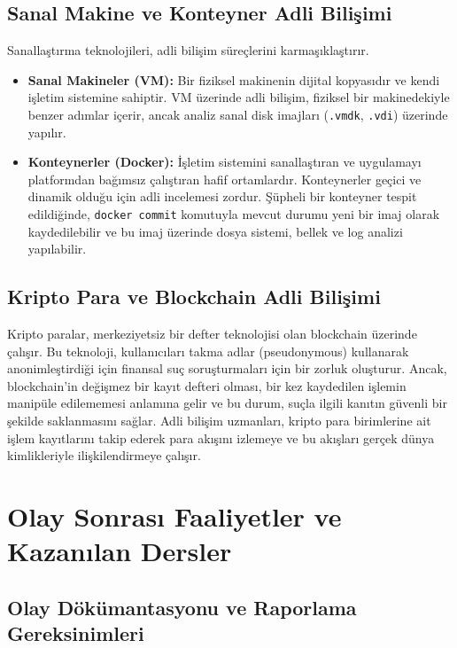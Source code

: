 \begin{itemize}
\subsection{Sanal Makine ve Konteyner Adli Bilişimi}

Sanallaştırma teknolojileri, adli bilişim süreçlerini karmaşıklaştırır.

\begin{itemize}
    \item \textbf{Sanal Makineler (VM):} Bir fiziksel makinenin dijital kopyasıdır ve kendi işletim sistemine sahiptir. VM üzerinde adli bilişim, fiziksel bir makinedekiyle benzer adımlar içerir, ancak analiz sanal disk imajları (\texttt{.vmdk}, \texttt{.vdi}) üzerinde yapılır.
    \item \textbf{Konteynerler (Docker):} İşletim sistemini sanallaştıran ve uygulamayı platformdan bağımsız çalıştıran hafif ortamlardır. Konteynerler geçici ve dinamik olduğu için adli incelemesi zordur. Şüpheli bir konteyner tespit edildiğinde, \texttt{docker commit} komutuyla mevcut durumu yeni bir imaj olarak kaydedilebilir ve bu imaj üzerinde dosya sistemi, bellek ve log analizi yapılabilir.
\end{itemize}

\subsection{Kripto Para ve Blockchain Adli Bilişimi}

Kripto paralar, merkeziyetsiz bir defter teknolojisi olan blockchain üzerinde çalışır. Bu teknoloji, kullanıcıları takma adlar (pseudonymous) kullanarak anonimleştirdiği için finansal suç soruşturmaları için bir zorluk oluşturur. Ancak, blockchain'in değişmez bir kayıt defteri olması, bir kez kaydedilen işlemin manipüle edilememesi anlamına gelir ve bu durum, suçla ilgili kanıtın güvenli bir şekilde saklanmasını sağlar. Adli bilişim uzmanları, kripto para birimlerine ait işlem kayıtlarını takip ederek para akışını izlemeye ve bu akışları gerçek dünya kimlikleriyle ilişkilendirmeye çalışır.

\section{Olay Sonrası Faaliyetler ve Kazanılan Dersler}

\subsection{Olay Dökümantasyonu ve Raporlama Gereksinimleri}


\end{itemize}
